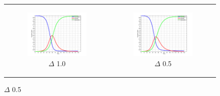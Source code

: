 \begin{figure}
\begin{center}
	\begin{tabular}{c c}
		\begin{subfigure}[b]{0.5\textwidth}
			\centering
			\includegraphics[width=.7\textwidth, angle=0]{./../shared/fig/SIR_SD_DYNAMICS_1000Agents_10dt.png}
			\caption{$\Delta$ 1.0}
			\label{fig:pd_seq}
		\end{subfigure}
    	&
		\begin{subfigure}[b]{0.5\textwidth}
			\centering
			\includegraphics[width=.7\textwidth, angle=0]{./../shared/fig/SIR_SD_DYNAMICS_1000Agents_05dt.png}
			\caption{$\Delta$ 0.5}
			\label{fig:pd_seq}
		\end{subfigure}
    	
    	\\
    	

\end{tabular}
\end{center}
\end{figure}
